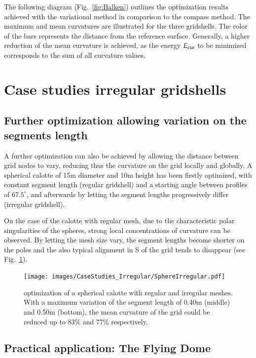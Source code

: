 \documentclass[Thesis.tex]{subfiles}
\begin{document}
The following diagram  (Fig.~\ref{fig:Balken}) outlines the optimization results achieved with the variational method in comparison to the compass method. The maximum and mean curvatures are illustrated for the three gridshells. The color of the bars represents the distance from the reference surface. Generally, a higher reduction of the mean curvature is achieved, as the energy $E_{\textrm{\scriptsize{cur}}}$ to be minimized corresponds to the sum of all curvature values.

\section{Case studies irregular gridshells}

\subsection{Further optimization allowing variation on the segments length}

A further optimization can also be achieved by allowing the distance between grid nodes to vary, reducing thus the curvature on the grid locally and globally. A spherical calotte of 15m diameter and 10m height has been firstly optimized, with constant segment length (regular gridshell) and a starting angle between profiles of $67.5^\circ$, and afterwards  by letting the segment lengths progressively differ (irregular gridshell). 

On the case of the calotte with regular mesh, due to the characteristic polar singularities of the spheres, strong local concentrations of curvature can be observed. By letting the mesh size vary, the segment lengths become shorter on the poles and the also typical alignment in S of the grid tends to disappear (see Fig.~\ref{fig:SphereIrregular}).

\begin{figure}
\centering
\texttt{[image: images/CaseStudies\_Irregular/SphereIrregular.pdf]}
\caption{optimization of a spherical calotte with regular and irregular meshes. With a maximum variation of the segment length of 0.40m (middle) and 0.50m (bottom), the mean curvature of the grid could be reduced up to 83\% and 77\% respectively.}
\label{fig:SphereIrregular}
\end{figure}

\subsection{Practical application: The Flying Dome}
\end{document}
